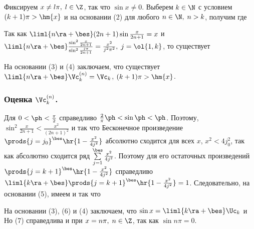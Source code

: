 \documentclass[a4paper]{article}
\begin{document}
\subsubsection{}

Фиксируем $x\ne l\pi, \; l\in\Z$, так что $\sin x\ne0$. Выберем
$k\in\N$ с условием $(k+1)\pi > \hm{x}$ и на основании (2) для
любого $n\in\N, \; n>k$, получим  где  

Так как $\liml{n\ra+\bes} (2n+1) \sin\frac{x}{2n+1} = x$ и
$\liml{n\ra+\bes} \frac{\sin^2 \frac{x}{2n+1}}{\sin^2
\frac{j\pi}{2n+1}} = \frac{x^2}{j^2\pi^2}, \; j=\ol{1,k}$, то
существует 

На основании (3) и (4) заключаем, что существует $\liml{n\ra+\bes}
\Vc_k^{(n)} = \Vc_k$, $(k+1)\pi > \hm{x}$.

\subsubsection{Оценка $\Vc_k^{(n)}$.}

Для $0<\ph<\frac{\pi}2$ справедливо $\frac{2}{\pi}\ph < \sin\ph <
\ph$. Поэтому, $\sin^2 \frac{x}{2n+1} < \frac{x^2}{(2n+1)^2}$ и
 так что 
Бесконечное произведение $\prods{j=j_0}^{\bes} \hr{1 -
\frac{x^2}{4j^2}}$ абсолютно сходится для всех $x$, $x^2 < 4j_0^2$,
так как абсолютно сходится ряд $\sum\limits_{j=1}^{\bes}
\frac{x^2}{4j^2}$. Поэтому для его остаточных произведений
$\prods{j=k+1}^{\bes} \hr{1 - \frac{x^2}{4j^2}}$ справедливо
$\liml{k\ra+\bes} \prods{j=k+1}^{\bes} \hr{1 - \frac{x^2}{4j^2}} =
1$. Следовательно, на основании (5), имеем  и  так что 

На основании (3), (6) и (4) заключаем, что $\sin x =
\liml{k\ra+\bes} \Uc_k$ и  Но (7)
справедлива и при $x=n\pi, \; n\in\Z$, так как $\sin n\pi=0$.
\end{document}
